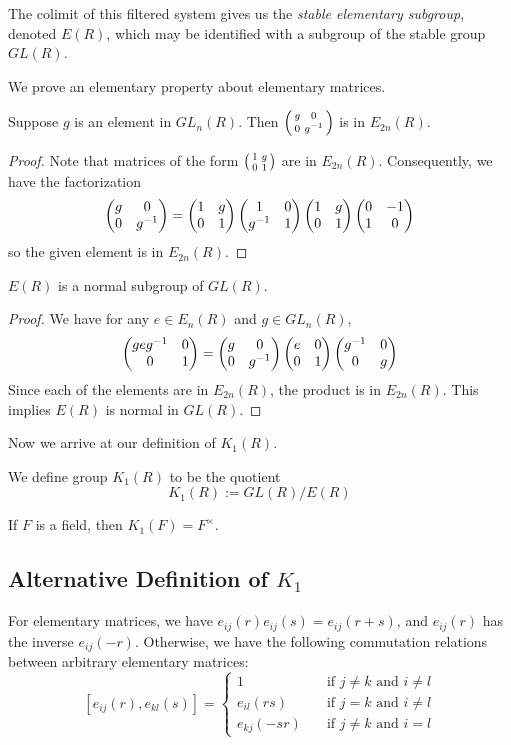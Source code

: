 \begin{definition}
The colimit of this filtered system gives us the \emph{stable elementary subgroup},
denoted $E(R)$, which may be identified with a subgroup of the stable group $GL(R)$.
\end{definition}

We prove an elementary property about elementary matrices. 

\begin{lemma}
Suppose $g$ is an element in $GL_n(R)$. Then
$\begin{psmallmatrix} g & 0 \\ 0 & g^{-1} \end{psmallmatrix}$ is in $E_{2n}(R)$.
\end{lemma}
\begin{proof}
Note that matrices of the form $\begin{psmallmatrix} 1 & g \\ 0 & 1 \end{psmallmatrix}$ are in $E_{2n}(R)$.
Consequently, we have the factorization
\[
\begin{pmatrix} g & 0 \\ 0 & g^{-1} \end{pmatrix} = \begin{pmatrix} 1 & g \\ 0 & 1 \end{pmatrix} \begin{pmatrix} 1 & 0 \\ g^{-1} & 1 \end{pmatrix} \begin{pmatrix} 1 & g \\ 0 & 1 \end{pmatrix} \begin{pmatrix} 0 & -1 \\ 1 & 0 \end{pmatrix}
\]
so the given element is in $E_{2n}(R)$.
\end{proof}

\begin{lemma}
$E(R)$ is a normal subgroup of $GL(R)$.
\end{lemma}
\begin{proof}
We have for any $e \in E_n(R)$ and $g \in GL_n(R)$,
\[
\begin{pmatrix} geg^{-1} & 0 \\ 0 & 1 \end{pmatrix} = \begin{pmatrix} g & 0 \\ 0 & g^{-1} \end{pmatrix} \begin{pmatrix} e & 0 \\ 0 & 1 \end{pmatrix} \begin{pmatrix} g^{-1} & 0 \\ 0 & g \end{pmatrix} 
\]
Since each of the elements are in $E_{2n}(R)$, the product is in $E_{2n}(R)$.
This implies $E(R)$ is normal in $GL(R)$.
\end{proof}

Now we arrive at our definition of $K_1(R)$.
\begin{definition}[$K_1(R)$]
 We define group $K_1(R)$ to be the quotient
 \[
 K_1(R) := GL(R)/E(R) 
 \]
\end{definition}

\begin{example}
If $F$ is a field, then $K_1(F) = F^\times$.
\end{example}

\subsection{Alternative Definition of $K_1$}

\begin{proposition}\label{prop:element}
For elementary matrices, we have $e_{ij}(r) e_{ij}(s) = e_{ij}(r+s)$, and $e_{ij}(r)$ has the inverse $e_{ij}(-r)$.
Otherwise, we have the following commutation relations between arbitrary elementary matrices:
\[
[e_{ij}(r),e_{kl}(s)] = \begin{cases}
1 \quad &\text{if $j \neq k$ and $i \neq l$} \\
e_{il}(rs) \quad &\text{if $j = k$ and $i \neq l$} \\
e_{kj}(-sr) \quad& \text{if $j \neq k$ and $i = l$}
\end{cases}
\]
\end{proposition}

